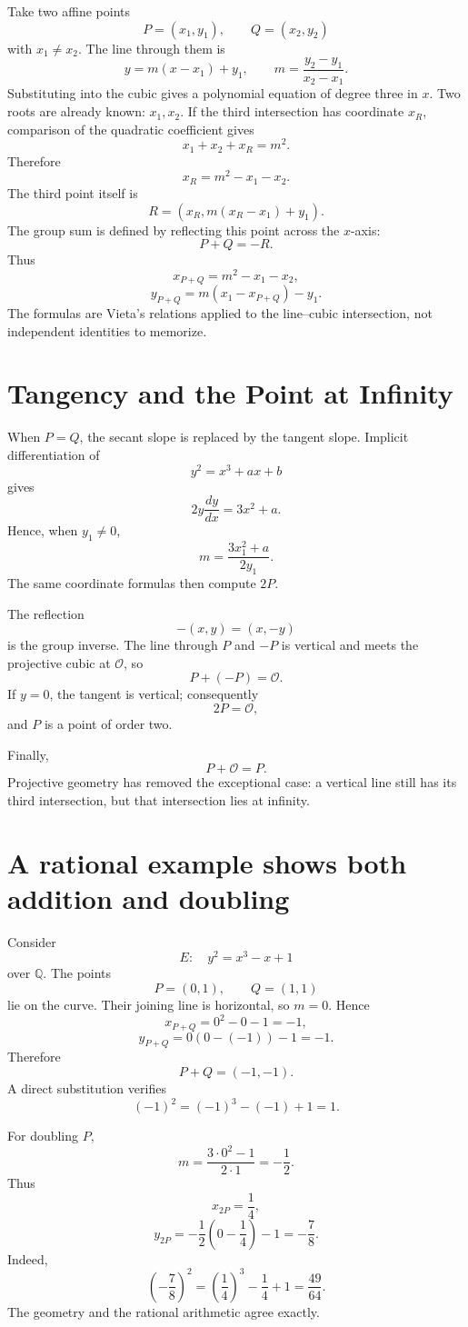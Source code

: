 Take two affine points
\[
  P=(x_1,y_1),
  \qquad
  Q=(x_2,y_2)
\]
with \(x_1\ne x_2\).  The line through them is
\[
  y=m(x-x_1)+y_1,
  \qquad
  m=\frac{y_2-y_1}{x_2-x_1}.
\]
Substituting into the cubic gives a polynomial equation of degree three in \(x\).  Two roots are already known: \(x_1,x_2\).  If the third intersection has coordinate \(x_R\), comparison of the quadratic coefficient gives
\[
  x_1+x_2+x_R=m^2.
\]
Therefore
\[
  x_R=m^2-x_1-x_2.
\]
The third point itself is
\[
  R=(x_R,m(x_R-x_1)+y_1).
\]
The group sum is defined by reflecting this point across the \(x\)-axis:
\[
  P+Q=-R.
\]
Thus
\[
  \boxed{
  x_{P+Q}=m^2-x_1-x_2,}
\]
\[
  \boxed{
  y_{P+Q}=m(x_1-x_{P+Q})-y_1.}
\]
The formulas are Vieta's relations applied to the line--cubic intersection, not independent identities to memorize.

\section{Tangency and the Point at Infinity}

When \(P=Q\), the secant slope is replaced by the tangent slope.  Implicit differentiation of
\[
  y^2=x^3+ax+b
\]
gives
\[
  2y\frac{dy}{dx}=3x^2+a.
\]
Hence, when \(y_1\ne0\),
\[
  m=\frac{3x_1^2+a}{2y_1}.
\]
The same coordinate formulas then compute \(2P\).

The reflection
\[
  -(x,y)=(x,-y)
\]
is the group inverse.  The line through \(P\) and \(-P\) is vertical and meets the projective cubic at \(\mathcal O\), so
\[
  P+(-P)=\mathcal O.
\]
If \(y=0\), the tangent is vertical; consequently
\[
  2P=\mathcal O,
\]
and \(P\) is a point of order two.

Finally,
\[
  P+\mathcal O=P.
\]
Projective geometry has removed the exceptional case: a vertical line still has its third intersection, but that intersection lies at infinity.

\section{A rational example shows both addition and doubling}

Consider
\[
  E:\quad y^2=x^3-x+1
\]
over \(\mathbb Q\).  The points
\[
  P=(0,1),
  \qquad
  Q=(1,1)
\]
lie on the curve.  Their joining line is horizontal, so \(m=0\).  Hence
\[
  x_{P+Q}=0^2-0-1=-1,
\]
\[
  y_{P+Q}=0(0-(-1))-1=-1.
\]
Therefore
\[
  P+Q=(-1,-1).
\]
A direct substitution verifies
\[
  (-1)^2=(-1)^3-(-1)+1=1.
\]

For doubling \(P\),
\[
  m=\frac{3\cdot0^2-1}{2\cdot1}=-\frac12.
\]
Thus
\[
  x_{2P}=\frac14,
\]
\[
  y_{2P}
  =-\frac12\left(0-\frac14\right)-1
  =-\frac78.
\]
Indeed,
\[
  \left(-\frac78\right)^2
  =\left(\frac14\right)^3-\frac14+1
  =\frac{49}{64}.
\]
The geometry and the rational arithmetic agree exactly.

